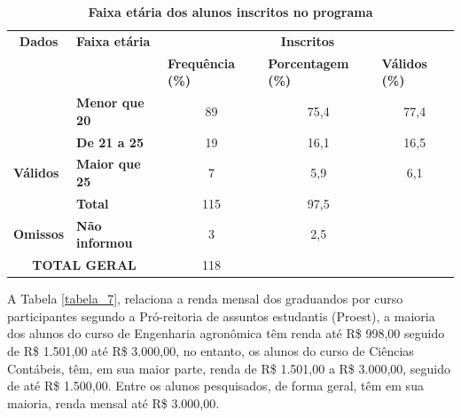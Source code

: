 \begin{table}[!htb]
\centering
\caption{\textbf{Faixa etária dos alunos inscritos no programa}}
\label{tab:tabela_4}
\begin{tabular}{clccc}
\hline \hline
{\textbf{Dados}} & {\color[HTML]{000000} \textbf{Faixa etária}} & \multicolumn{3}{c}{{\color[HTML]{000000} \textbf{Inscritos}}} \\ \cline{1-5}
{\color[HTML]{000000} } & {\color[HTML]{000000} } & \multicolumn{1}{l}{{\color[HTML]{000000} \textbf{Frequência (\%)}}} & \multicolumn{1}{l}{{\color[HTML]{000000} \textbf{Porcentagem (\%)}}} & \multicolumn{1}{l}{{\color[HTML]{000000} \textbf{Válidos (\%)}}} \\
{\color[HTML]{000000} } & {\color[HTML]{000000} \textbf{Menor que 20}} & {\color[HTML]{000000} 89} & {\color[HTML]{000000} 75,4} & {\color[HTML]{000000} 77,4}\\[8pt]
\multirow{-3}{*}{{\color[HTML]{000000} \textbf{}}} & {\color[HTML]{000000} \textbf{De 21 a 25}} & {\color[HTML]{000000} 19} & {\color[HTML]{000000} 16,1} & {\color[HTML]{000000} 16,5} \\[8pt]
\multicolumn{1}{l}{{\color[HTML]{000000} \textbf{Válidos}}} & {\color[HTML]{000000} \textbf{Maior que 25}} & {\color[HTML]{000000} 7} & {\color[HTML]{000000} 5,9} & {\color[HTML]{000000} 6,1}\\[8pt]
\multicolumn{1}{l}{{\color[HTML]{000000} \textbf{}}} & {\color[HTML]{000000} \textbf{Total}} & {\color[HTML]{000000} 115} & {\color[HTML]{000000} 97,5} & {\color[HTML]{000000} } \\[8pt]\hline
\multicolumn{1}{l}{{\color[HTML]{000000} \textbf{Omissos}}} & {\color[HTML]{000000} \textbf{Não informou}} & {\color[HTML]{000000} 3} & {\color[HTML]{000000} 2,5} & {\color[HTML]{000000} } \\[8pt] \hline
\multicolumn{2}{c}{{\color[HTML]{000000} \textbf{TOTAL GERAL}}} & {\color[HTML]{000000} 118} & {\color[HTML]{000000} } & {\color[HTML]{000000} } \\ \hline\hline
\end{tabular}
\end{table}


A Tabela  \ref{tabela_7}, relaciona a renda mensal dos graduandos por curso participantes segundo a Pró-reitoria de assuntos estudantis (Proest), a maioria dos alunos do curso de Engenharia agronômica  têm renda até R\$ 998,00 seguido de R\$ 1.501,00 até R\$ 3.000,00, no entanto, os alunos do curso de Ciências Contábeis, têm, em sua maior parte, renda de R\$ 1.501,00 a R\$ 3.000,00, seguido de até R\$ 1.500,00. Entre os alunos pesquisados, de forma geral, têm em sua maioria, renda mensal até R\$ 3.000,00.



